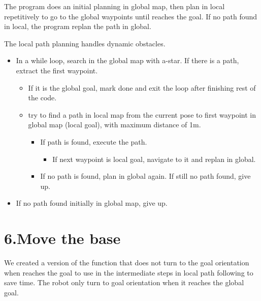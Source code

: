 \documentclass{article}
\begin{document}
\noindent{}The program does an initial planning in global map, then plan in local repetitively to go to the global waypoints until reaches the goal. If no path found in local, the program replan the path in global.%

The local path planning handles dynamic obstacles.%

\begin{itemize}[noitemsep,topsep=\mdcompacttopsep]%

\item{}In a while loop, search in the global map with a-star. If there is a path, extract the first waypoint.

\begin{itemize}[noitemsep,topsep=\mdcompacttopsep]%

\item{}If it is the global goal, mark done and exit the loop after finishing rest of the code.%

\item{}try to find a path in local map from the current pose to first waypoint in global map (local goal), with maximum distance of 1m. 

\begin{itemize}[noitemsep,topsep=\mdcompacttopsep]%

\item{}If path is found, execute the path. 

\begin{itemize}[noitemsep,topsep=\mdcompacttopsep]%

\item{}If next waypoint is local goal, navigate to it and replan in global.%
\end{itemize}%

\item{}If no path is found, plan in global again. If still no path found, give up.%
\end{itemize}%
\end{itemize}%

\item{}If no path found initially in global map, give up.%
\end{itemize}%

\section{6.\hspace*{0.5em}Move the base}\label{sec-move-the-base}%

\noindent{}We created a version of the  function that does not turn to the goal orientation when reaches the goal to use in the intermediate steps in local path following to save time. The robot only turn to goal orientation when it reaches the global goal.%
\end{document}
